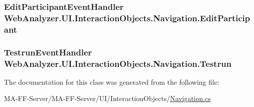 \subsubsection[{Edit\+Participant}]{\setlength{\rightskip}{0pt plus 5cm}Edit\+Participant\+Event\+Handler Web\+Analyzer.\+U\+I.\+Interaction\+Objects.\+Navigation.\+Edit\+Participant}\label{class_web_analyzer_1_1_u_i_1_1_interaction_objects_1_1_navigation_adc0aa816457297571e9dd44ffe09a372}
\hypertarget{class_web_analyzer_1_1_u_i_1_1_interaction_objects_1_1_navigation_a34448e99688e6e15b470a981a86a4bba}{}
\subsubsection[{Testrun}]{\setlength{\rightskip}{0pt plus 5cm}Testrun\+Event\+Handler Web\+Analyzer.\+U\+I.\+Interaction\+Objects.\+Navigation.\+Testrun}\label{class_web_analyzer_1_1_u_i_1_1_interaction_objects_1_1_navigation_a34448e99688e6e15b470a981a86a4bba}


The documentation for this class was generated from the following file\+:\begin{DoxyCompactItemize}
\item 
M\+A-\/\+F\+F-\/\+Server/\+M\+A-\/\+F\+F-\/\+Server/\+U\+I/\+Interaction\+Objects/\hyperlink{_navigation_8cs}{Navigation.\+cs}\end{DoxyCompactItemize}
